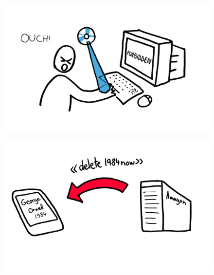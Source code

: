 \documentclass[notes,usenames,dvipsnames]{beamer}       %
\begin{document}
\begin{frame}
  \begin{figure}
    \centering
    \includegraphics[scale=0.8]{img/pr-restrict}
  \end{figure}
\end{frame}

\begin{frame}
  \begin{figure}
    \centering
    \includegraphics[scale=0.5]{img/pr-remote-delete}
  \end{figure}
\end{frame}
\end{document}
